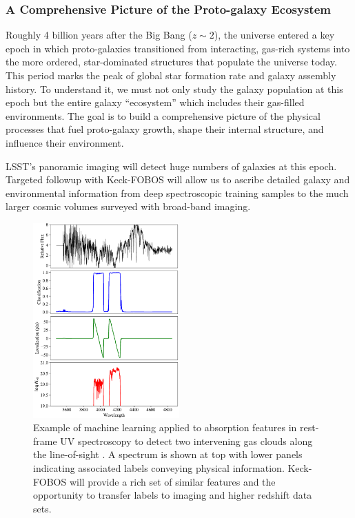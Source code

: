 \documentclass[oneside,11pt]{amsart}
\newcommand{\comment}[2][todo]{{\color{#1}[[{\bf #2}]]}}
\begin{document}
\subsubsection{A Comprehensive Picture of the Proto-galaxy Ecosystem}
\label{sec:galaxies}
\noindent \comment{1 page}

Roughly 4 billion years after the Big Bang ($z \sim 2$), the universe
entered a key epoch in which proto-galaxies transitioned from
interacting, gas-rich systems into the more ordered, star-dominated
structures that populate the universe today.  This period marks the peak
of global star formation rate and galaxy assembly history.   To
understand it, we must not only study the galaxy population at this
epoch but the entire galaxy ``ecosystem'' which includes their
gas-filled environments.  The goal is to build a comprehensive picture
of the physical processes that fuel proto-galaxy growth, shape their
internal structure, and influence their environment.

LSST's panoramic imaging will detect huge numbers of galaxies at this
epoch.  Targeted followup with Keck-FOBOS will allow us to ascribe
detailed galaxy and environmental information from deep spectroscopic
training samples to the much larger cosmic volumes surveyed with
broad-band imaging.

\begin{figure}[h!]
%
\vskip -0.1in
%
\includegraphics[width=0.5\textwidth]{Parks18_Fig7_fig_labels.pdf}
%
\caption{\small Example of machine learning applied to absorption
features in rest-frame UV spectroscopy to detect two intervening gas
clouds along the line-of-sight \citep[from][]{parks18}.  A spectrum is
shown at top with lower panels indicating associated labels conveying
physical information.  Keck-FOBOS will provide a rich set of similar
features and the opportunity to transfer labels to imaging and higher
redshift data sets.}
%
\label{fig:absorber}
%
\end{figure}
\end{document}
